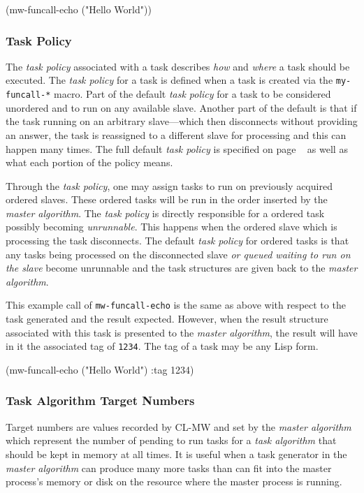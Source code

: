 \documentclass[titlepage,12pt]{book}
\newcommand{\xsmall}{\latexhtml{\small}{}}
\newcommand{\xnormalsize}{\latexhtml{\normalsize}{}}
\newcommand{\clmw}{\xsmall\textsc{CL-MW}\xnormalsize\xspace}
\newcommand{\ma}{\textit{master algorithm}\xspace}
\newcommand{\ta}{\textit{task algorithm}\xspace}
\newcommand{\tp}{\textit{task policy}\xspace}
\newcommand{\macro}[1]{\mbox{\texttt{#1}}\xspace}
\begin{document}
\begin{barelisp}
(mw-funcall-echo ("Hello World"))
\end{barelisp}

\subsubsection{Task Policy}

The \tp associated with a task describes \emph{how} and \emph{where}
a task should be executed.  The \tp for a task is defined when a
task is created via the \macro{my-funcall-*} macro. Part of the
default \tp for a task to be considered unordered and to run on
any available slave.  Another part of the default is that if the
task running on an arbitrary slave---which then disconnects without
providing an answer, the task is reassigned to a different slave for
processing and this can happen many times.  The full default \tp is
specified on page ~\pageref{task-policy} as well as what each portion
of the policy means.

Through the \tp, one may assign tasks to run on previously acquired
ordered slaves. These ordered tasks will be run in the
order inserted by the \ma.  The \tp is directly responsible for a
ordered task possibly becoming \emph{unrunnable}. This happens when
the ordered slave which is processing the task disconnects. The
default \tp for ordered tasks is that any tasks being processed on
the disconnected slave \textit{or queued waiting to run on the slave}
become unrunnable and the task structures are given back to the \ma.

This example call of \macro{mw-funcall-echo} is the same as above with
respect to the task generated and the result expected. However, when
the result structure associated with this task is presented to the
\ma, the result will have in it the associated tag of \texttt{1234}.
The tag of a task may be any Lisp form.

\begin{barelisp}
(mw-funcall-echo ("Hello World") :tag 1234)
\end{barelisp}

\subsubsection{Task Algorithm Target Numbers}

Target numbers are values recorded by \clmw and set by the \ma which
represent the number of pending to run tasks for a \ta that should be
kept in memory at all times.  It is useful when a task generator in the
\ma can produce many more tasks than can fit into the master process's
memory or disk on the resource where the master process is running.
\end{document}
